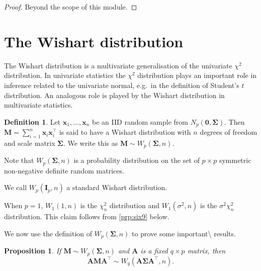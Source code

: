 \documentclass[]{book}
\newtheorem{proposition}{Proposition}[chapter]
\theoremstyle{definition}
\newtheorem{definition}{Definition}[chapter]
\theoremstyle{definition}
\theoremstyle{definition}
\theoremstyle{remark}
\begin{document}
\begin{proof}
{}Beyond the scope of this module.
\end{proof}

\hypertarget{the-wishart-distribution}{%
\section{The Wishart distribution}\label{the-wishart-distribution}}

The Wishart distribution is a multivariate generalisation of the univariate \(\chi^2\) distribution. In univariate statistics the \(\chi^2\) distribution plays an important role in inference related to the univariate normal, e.g.~in the definition of Student's \(t\) distribution. An analogous role is played by the Wishart distribution in multivariate statistics.

\begin{definition}
\protect\hypertarget{def:wishart}{}{\label{def:wishart} } Let \(\boldsymbol x_1, \ldots, \boldsymbol x_n\) be an IID random sample from \(N_p (\boldsymbol 0, \boldsymbol \Sigma)\). Then \(\boldsymbol M= \sum_{i=1}^n \boldsymbol x_i \boldsymbol x_i^\top\)
is said to have a Wishart distribution with \(n\) degrees of freedom and scale matrix \(\boldsymbol \Sigma\). We write this as \(\boldsymbol M\sim W_p(\boldsymbol \Sigma, n)\).
\end{definition}

Note that \(W_p(\boldsymbol \Sigma,n)\) is a probability distribution on the set of \(p \times p\) symmetric non-negative definite random matrices.

We call \(W_p(\boldsymbol I_p,n)\) a standard Wishart distribution.

When \(p=1\), \(W_1(1,n)\) is the \(\chi_n^2\) distribution and \(W_1(\sigma^2,n)\) is the \(\sigma^2 \chi_n^2\) distribution. This claim follows from \ref{prp:six9} below.

We now use the definition of \(W_p(\boldsymbol \Sigma, n)\) to prove some important\textbackslash{}
results.

\begin{proposition}
\protect\hypertarget{prp:six8}{}{\label{prp:six8} }If \(\boldsymbol M\sim W_p(\boldsymbol \Sigma,n)\) and \(\boldsymbol A\) is a fixed \(q \times p\) matrix, then
\[ \boldsymbol A\boldsymbol M\boldsymbol A^\top \sim W_q \left(\boldsymbol A\boldsymbol \Sigma\boldsymbol A^\top, n \right).\]
\end{proposition}
\end{document}

